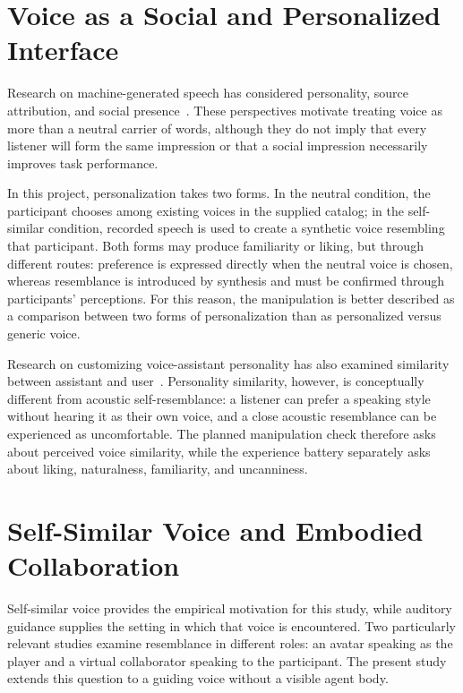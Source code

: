 \section{Voice as a Social and Personalized Interface}
Research on machine-generated speech has considered personality, source attribution, and social presence~\cite{nass1993voices,nass2001personality,lee2005socialpresence}. These perspectives motivate treating voice as more than a neutral carrier of words, although they do not imply that every listener will form the same impression or that a social impression necessarily improves task performance.

In this project, personalization takes two forms. In the neutral condition, the participant chooses among existing voices in the supplied catalog; in the self-similar condition, recorded speech is used to create a synthetic voice resembling that participant. Both forms may produce familiarity or liking, but through different routes: preference is expressed directly when the neutral voice is chosen, whereas resemblance is introduced by synthesis and must be confirmed through participants' perceptions. For this reason, the manipulation is better described as a comparison between two forms of personalization than as personalized versus generic voice.

Research on customizing voice-assistant personality has also examined similarity between assistant and user~\cite{snyder2023onevoice}. Personality similarity, however, is conceptually different from acoustic self-resemblance: a listener can prefer a speaking style without hearing it as their own voice, and a close acoustic resemblance can be experienced as uncomfortable. The planned manipulation check therefore asks about perceived voice similarity, while the experience battery separately asks about liking, naturalness, familiarity, and uncanniness.

\section{Self-Similar Voice and Embodied Collaboration}
Self-similar voice provides the empirical motivation for this study, while auditory guidance supplies the setting in which that voice is encountered. Two particularly relevant studies examine resemblance in different roles: an avatar speaking as the player and a virtual collaborator speaking to the participant. The present study extends this question to a guiding voice without a visible agent body.

